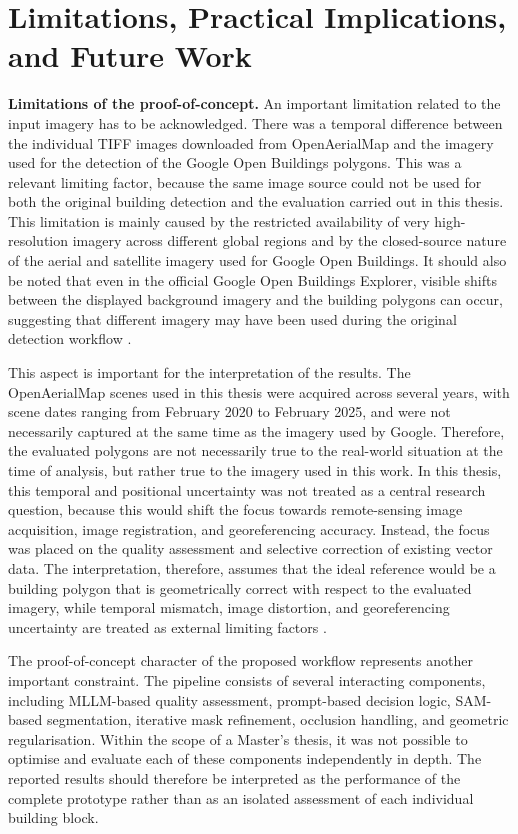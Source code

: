 \section{Limitations, Practical Implications, and Future Work}
\label{10_limitations}

\textbf{Limitations of the proof-of-concept.}
An important limitation related to the input imagery has to be acknowledged. There was a temporal difference between the individual TIFF images downloaded from OpenAerialMap and the imagery used for the detection of the Google Open Buildings polygons. This was a relevant limiting factor, because the same image source could not be used for both the original building detection and the evaluation carried out in this thesis. This limitation is mainly caused by the restricted availability of very high-resolution imagery across different global regions and by the closed-source nature of the aerial and satellite imagery used for Google Open Buildings. It should also be noted that even in the official Google Open Buildings Explorer, visible shifts between the displayed background imagery and the building polygons can occur, suggesting that different imagery may have been used during the original detection workflow \citep{sirko2021continentalscalebuildingdetectionhigh}.

This aspect is important for the interpretation of the results. The OpenAerialMap scenes used in this thesis were acquired across several years, with scene dates ranging from February 2020 to February 2025, and were not necessarily captured at the same time as the imagery used by Google. Therefore, the evaluated polygons are not necessarily true to the real-world situation at the time of analysis, but rather true to the imagery used in this work. In this thesis, this temporal and positional uncertainty was not treated as a central research question, because this would shift the focus towards remote-sensing image acquisition, image registration, and georeferencing accuracy. Instead, the focus was placed on the quality assessment and selective correction of existing vector data. The interpretation, therefore, assumes that the ideal reference would be a building polygon that is geometrically correct with respect to the evaluated imagery, while temporal mismatch, image distortion, and georeferencing uncertainty are treated as external limiting factors \citep{Toutin01052004}.

The proof-of-concept character of the proposed workflow represents another important constraint. The pipeline consists of several interacting components, including MLLM-based quality assessment, prompt-based decision logic, SAM-based segmentation, iterative mask refinement, occlusion handling, and geometric regularisation. Within the scope of a Master's thesis, it was not possible to optimise and evaluate each of these components independently in depth. The reported results should therefore be interpreted as the performance of the complete prototype rather than as an isolated assessment of each individual building block.

